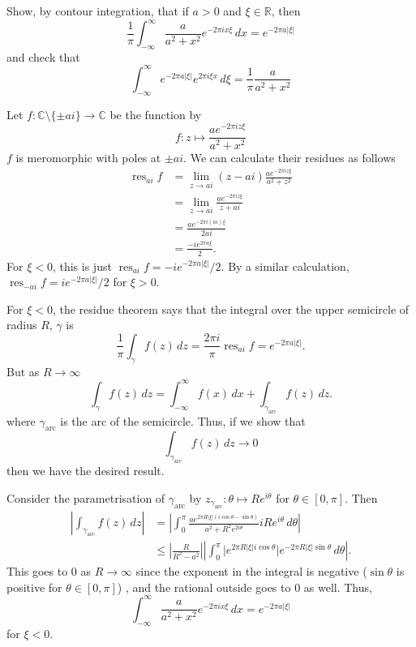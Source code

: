 \documentclass[12 pt, letterpaper]{hmcpset}
\begin{document}
\begin{problem}[3.]
	Show, by contour integration, that if $a > 0$ and $\xi \in \mathbb{R}$, then
	\[
		\frac{1}{\pi} \int_{-\infty}^{\infty} \frac{a}{a^{2} + x^{2}} e^{-2 \pi i x \xi} \, dx = e^{-2 \pi a \lvert \xi \rvert}
	\]
	and check that
	\[
		\int_{-\infty}^{\infty} e^{-2 \pi a \lvert \xi \rvert} e^{2 \pi i \xi x} \, d\xi = \frac{1}{\pi} \frac{a}{a^{2} + x^{2}}
	\]
\end{problem}

\begin{solution} 
	Let $f : \mathbb{C} \setminus \{ \pm ai \} \to \mathbb{C}$ be the function by
	\[
		f : z \mapsto \frac{a e^{- 2 \pi i z \xi}}{a^{2} + x^{2}}
	\]
	$f$ is meromorphic with poles at $\pm ai$. We can calculate their residues as follows
	\[
		\begin{split}
			\operatorname{res}_{ai} f & = \lim_{z \to ai} (z - ai) \frac{ae^{-2 \pi i z \xi}}{a^{2} + z^{2}} \\
						  & = \lim_{z \to ai} \frac{a e^{-2 \pi i z \xi}}{z + ai} \\
						  & = \frac{a e^{- 2 \pi i (a i) \xi}}{2 a i} \\
						  & = \frac{-i e^{2 \pi a \xi}}{2}.
		\end{split}
	\]
	For $\xi < 0$, this is just $\operatorname{res}_{ai} f = - i e^{- 2 \pi a \lvert \xi \rvert} / 2$. By a similar calculation, $\operatorname{res}_{- ai} f = i e^{- 2 \pi a \lvert \xi \rvert} / 2$ for $\xi > 0$.

	For $\xi < 0$, the residue theorem says that the integral over the upper semicircle of radius $R$, $\gamma$ is
	\[
		\frac{1}{\pi} \int_{\gamma} f(z) \, dz = \frac{2 \pi i}{\pi} \operatorname{res}_{ai} f = e^{-2 \pi a \lvert \xi \rvert}.
	\]
	But as $R \to \infty$
	\[
		\int_{\gamma} f(z) \, dz = \int_{-\infty}^{\infty} f(x) \, dx + \int_{\gamma_{\text{arc}}} f(z) \, dz.
	\]
	where $\gamma_{\text{arc}}$ is the arc of the semicircle. Thus, if we show that
	\[
		\int_{\gamma_{\text{arc}}} f(z) \, dz \to 0
	\]
	then we have the desired result.

	Consider the parametrisation of $\gamma_{\text{arc}}$ by $z_{\gamma_{\text{arc}}} : \theta \mapsto R e^{i \theta}$ for $\theta \in [0, \pi]$. Then
	\[
		\begin{split}
			\left \lvert \int_{\gamma_{\text{arc}}} f(z) \, dz \right \rvert & = \left \lvert \int_{0}^{\pi} \frac{a e^{2 \pi R \lvert \xi \rvert (i \cos{\theta} - \sin{\theta})}}{a^{2} + R^{2} e^{2 i \theta}} i R e^{i \theta} \, d\theta \right \rvert \\
											 & \le \left \lvert \frac{R}{R^{2} - a^{2}} \right \rvert \left \lvert \int_{0}^{\pi} \lvert e^{2 \pi R \lvert \xi \rvert i \cos{\theta}} \rvert e^{- 2 \pi R \lvert \xi \rvert \sin{\theta}} \, d\theta  \right \rvert.
		\end{split}
	\]
	This goes to $0$ as $R \to \infty$ since the exponent in the integral is negative ($\sin{\theta}$ is positive for $\theta \in [0, \pi]$) , and the rational outside goes to $0$ as well. Thus,
	\[
		\int_{-\infty}^{\infty} \frac{a}{a^{2} + x^{2}} e^{-2 \pi i x \xi}  \, dx = e^{-2 \pi a \lvert \xi \rvert}
	\]
	for $\xi < 0$.


\end{solution}
\end{document}
